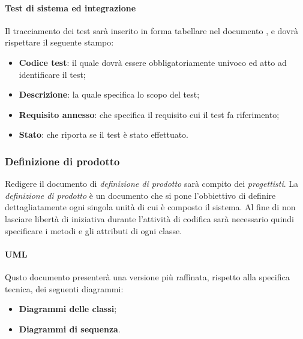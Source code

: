 \paragraph{Test di sistema ed integrazione}
Il tracciamento dei test sarà inserito in forma tabellare nel documento \PianoDiQualifica, e dovrà rispettare il seguente stampo:
\begin{itemize}
\item \textbf{Codice test}: il quale dovrà essere obbligatoriamente univoco ed atto ad identificare il test;
\item \textbf{Descrizione}: la quale specifica lo scopo del test;
\item \textbf{Requisito annesso}: che specifica il requisito cui il test fa riferimento;
\item \textbf{Stato}: che riporta se il test è stato effettuato.
\end{itemize}

\subsubsection{Definizione di prodotto}
Redigere il documento di \textit{definizione di prodotto} sarà compito dei \textit{progettisti}.
La \textit{definizione di prodotto} è un documento che si pone l'obbiettivo di definire dettagliatamente ogni singola unità di cui è composto il sistema. Al fine di non lasciare libertà di iniziativa durante l'attività di codifica sarà necessario quindi specificare i metodi e gli  attributi di ogni classe.

\paragraph{UML}\begin{flushleft}
Qusto documento presenterà una versione più raffinata, rispetto alla specifica tecnica, dei seguenti diagrammi:
\end{flushleft}
\begin{itemize}
\item \textbf{Diagrammi delle classi};
\item \textbf{Diagrammi di sequenza}.
\end{itemize}

